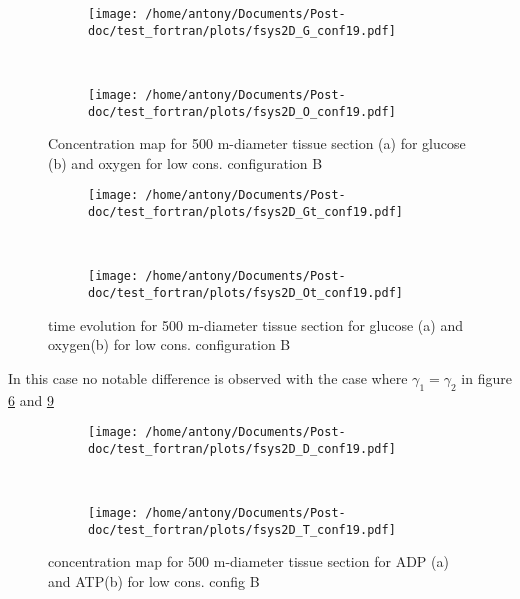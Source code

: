 \documentclass[11pt,a4paper]{article}
\begin{document}
\begin{figure}[ht!]
	\begin{subfigure}{0.45\textwidth}
	\centering
	\texttt{[image: /home/antony/Documents/Post-doc/test\_fortran/plots/fsys2D\_G\_conf19.pdf]}
	\caption{ \label{G_conf19}}
	\end{subfigure}
	~~
	\begin{subfigure}{0.45\textwidth}
	\texttt{[image: /home/antony/Documents/Post-doc/test\_fortran/plots/fsys2D\_O\_conf19.pdf]}
		\caption{ \label{O_conf19}}
	\end{subfigure}
	\caption{Concentration map for 500 \textmu m-diameter tissue section  (a) for glucose (b) and oxygen \label{conf19} for low cons. configuration B}
\end{figure} 

\begin{figure}[ht!]
	\begin{subfigure}{0.45\textwidth}
	\centering
	\texttt{[image: /home/antony/Documents/Post-doc/test\_fortran/plots/fsys2D\_Gt\_conf19.pdf]}
	\caption{ \label{Gt_conf19}}
	\end{subfigure}
	~~
	\begin{subfigure}{0.45\textwidth}
	\texttt{[image: /home/antony/Documents/Post-doc/test\_fortran/plots/fsys2D\_Ot\_conf19.pdf]}
		\caption{ \label{Ot_conf19}}
	\end{subfigure}
	\caption{time evolution for 500 \textmu m-diameter tissue section  for glucose (a) and oxygen(b) for low cons. configuration B \label{tconf19}}
\end{figure}

In this case no notable difference is observed with the case where $\gamma_1 = \gamma_2$ in figure \ref{tconf19} and \ref{DTconf19}

\begin{figure}[ht!]
	\begin{subfigure}{0.45\textwidth}
	\centering
	\texttt{[image: /home/antony/Documents/Post-doc/test\_fortran/plots/fsys2D\_D\_conf19.pdf]}
	\caption{ \label{D_conf19}}
	\end{subfigure}
	~~
	\begin{subfigure}{0.45\textwidth}
	\texttt{[image: /home/antony/Documents/Post-doc/test\_fortran/plots/fsys2D\_T\_conf19.pdf]}
		\caption{ \label{T_conf19}}
	\end{subfigure}
	\caption{concentration map for 500 \textmu m-diameter tissue section  for ADP (a) and ATP(b) for low cons. config B \label{DTconf19}}
\end{figure}
\end{document}
